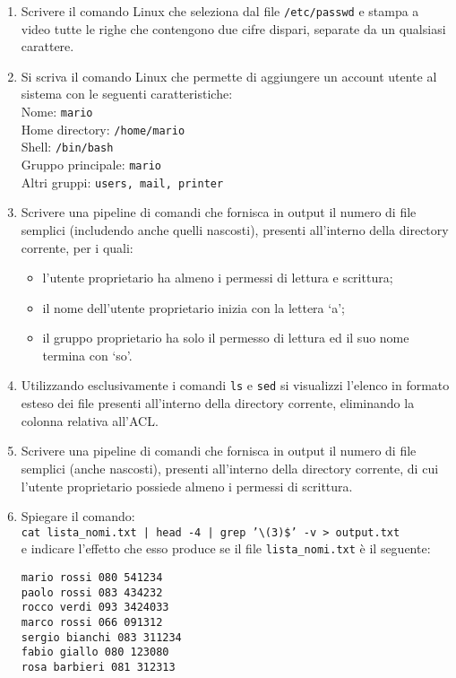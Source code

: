 \documentclass{report}
\begin{document}
\begin{enumerate}
    \item Scrivere il comando Linux che seleziona dal file \texttt{/etc/passwd} e stampa a video tutte le righe che contengono due cifre dispari, separate da un qualsiasi carattere.
    
    \item Si scriva il comando Linux che permette di aggiungere un account utente al sistema con le seguenti caratteristiche: \\
    Nome: \texttt{mario} \\
    Home directory: \texttt{/home/mario} \\
    Shell: \texttt{/bin/bash} \\
    Gruppo principale: \texttt{mario} \\
    Altri gruppi: \texttt{users, mail, printer}
    \newpage
    \item Scrivere una pipeline di comandi che fornisca in output il numero di file semplici (includendo anche quelli nascosti), presenti all’interno della directory corrente, per i quali:
    \begin{itemize}
        \item l’utente proprietario ha almeno i permessi di lettura e scrittura;
        \item il nome dell’utente proprietario inizia con la lettera ‘a’;
        \item il gruppo proprietario ha solo il permesso di lettura ed il suo nome termina con ‘so’.
    \end{itemize}
    
    \item Utilizzando esclusivamente i comandi \texttt{ls} e \texttt{sed} si visualizzi l’elenco in formato esteso dei file presenti all’interno della directory corrente, eliminando la colonna relativa all’ACL.
    
    \item Scrivere una pipeline di comandi che fornisca in output il numero di file semplici (anche nascosti), presenti all’interno della directory corrente, di cui l’utente proprietario possiede almeno i permessi di scrittura.
    
    \item Spiegare il comando: \\
    \texttt{cat lista\_nomi.txt | head -4 | grep '\textbackslash (3\textbar [34])\$' -v > output.txt} \\
    e indicare l’effetto che esso produce se il file \texttt{lista\_nomi.txt} è il seguente:
    \begin{verbatim}
mario rossi 080 541234
paolo rossi 083 434232
rocco verdi 093 3424033
marco rossi 066 091312
sergio bianchi 083 311234
fabio giallo 080 123080
rosa barbieri 081 312313
    \end{verbatim}
    

\end{enumerate}
\end{document}
